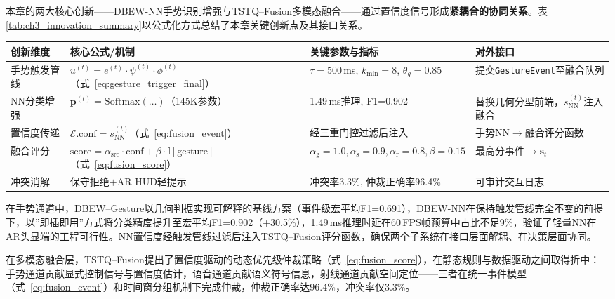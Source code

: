 本章的两大核心创新——DBEW-NN手势识别增强与TSTQ--Fusion多模态融合——通过置信度信号形成\textbf{紧耦合的协同关系}。表\ref{tab:ch3_innovation_summary}以公式化方式总结了本章关键创新点及其接口关系。

\begin{center}
    \footnotesize
    \begin{tabular}{p{2.2cm}p{4.3cm}p{4.3cm}p{3.2cm}}
    \hline
    创新维度 & 核心公式/机制 & 关键参数与指标 & 对外接口 \\
    \hline
    手势触发管线 & $u^{(t)}=e^{(t)}\cdot\psi^{(t)}\cdot\phi^{(t)}$（式~\ref{eq:gesture_trigger_final}） & $\tau{=}500$\,ms, $k_{\min}{=}8$, $\theta_g{=}0.85$ & 提交\texttt{GestureEvent}至融合队列 \\
    NN分类增强 & $\mathbf{p}^{(t)}{=}\mathrm{Softmax}(\ldots)$（145K参数） & 1.49\,ms推理, F1{=}0.902 & 替换几何分型前端，$s^{(t)}_{\mathrm{NN}}$注入融合 \\
    置信度传递 & $\mathcal{E}.\mathrm{conf}=s^{(t)}_{\mathrm{NN}}$（式~\ref{eq:fusion_event}） & 经三重门控过滤后注入 & 手势NN$\rightarrow$融合评分函数 \\
    融合评分 & $\mathrm{score}=\alpha_{\mathrm{src}}\cdot\mathrm{conf}+\beta\cdot\mathbb{I}[\mathrm{gesture}]$（式~\ref{eq:fusion_score}） & $\alpha_{\mathrm{g}}{=}1.0,\alpha_{\mathrm{s}}{=}0.9,\alpha_{\mathrm{r}}{=}0.8,\beta{=}0.15$ & 最高分事件$\rightarrow\mathbf{s}_t$ \\
    冲突消解 & 保守拒绝$+$AR HUD轻提示 & 冲突率3.3\%, 仲裁正确率96.4\% & 可审计交互日志 \\
    \hline
    \end{tabular}
\end{center}

在手势通道中，DBEW--Gesture以几何判据实现可解释的基线方案（事件级宏平均F1=0.691），DBEW-NN在保持触发管线完全不变的前提下，以”即插即用”方式将分类精度提升至宏平均F1=0.902（+30.5\%），1.49\,ms推理时延在60\,FPS帧预算中占比不足9\%，验证了轻量NN在AR头显端的工程可行性。NN置信度经触发管线过滤后注入TSTQ--Fusion评分函数，确保两个子系统在接口层面解耦、在决策层面协同。

在多模态融合层，TSTQ--Fusion提出了置信度驱动的动态优先级仲裁策略（式~\ref{eq:fusion_score}），在静态规则与数据驱动之间取得折中：手势通道贡献显式控制信号与置信度估计，语音通道贡献语义符号信息，射线通道贡献空间定位——三者在统一事件模型（式~\ref{eq:fusion_event}）和时间窗分组机制下完成仲裁，仲裁正确率达96.4\%，冲突率仅3.3\%。

